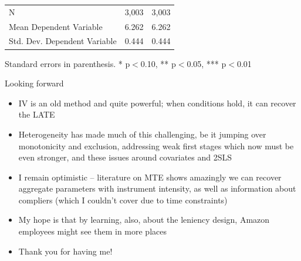 \documentclass{beamer}
\begin{document}
\begin{frame}[plain]
\begin{table}[htbp]
\begin{center}
\begin{threeparttable}
\begin{tabular}{l*{2}{c}}
          N                                 & 3,003     & 3,003     \\
          Mean Dependent Variable           & 6.262     & 6.262     \\
          Std. Dev. Dependent Variable      & 0.444     & 0.444     \\
          \bottomrule
        \end{tabular}
        \begin{tablenotes}
          \tiny
          \item Standard errors in parenthesis. * p$<$0.10, ** p$<$0.05, *** p$<$0.01
        \end{tablenotes}
      \end{threeparttable}
    \end{center}
  \end{table}

\end{frame}



\begin{frame}{Looking forward}
  \begin{itemize}

    \item IV is an old method and quite powerful; when conditions hold, it can recover the LATE
    \item Heterogeneity has made much of this challenging, be it jumping over monotonicity and exclusion, addressing weak first stages which now must be even stronger, and these issues around covariates and 2SLS
    \item I remain optimistic -- literature on MTE shows amazingly we can recover aggregate parameters with instrument intensity, as well as information about compliers (which I couldn't cover due to time constraints)
    \item My hope is that by learning, also, about the leniency design, Amazon employees might see them in more places
    \item Thank you for having me!

  \end{itemize}

\end{frame}
\end{document}
